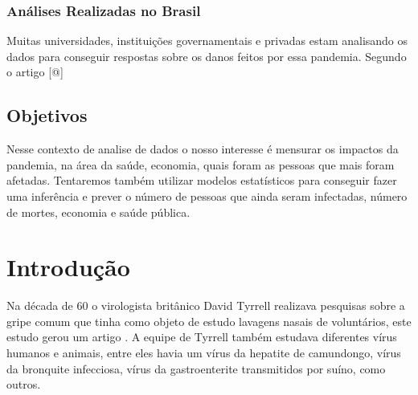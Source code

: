\documentclass[
  fleqn,ebook]{ic}
\begin{document}
\hypertarget{anuxe1lises-realizadas-no-brasil}{%
\subsubsection{Análises Realizadas no Brasil}\label{anuxe1lises-realizadas-no-brasil}}

Muitas universidades, instituições governamentais e privadas estam analisando
os dados para conseguir respostas sobre os danos feitos por essa pandemia.
Segundo o artigo {[}@{]}

\hypertarget{objetivos}{%
\subsection{Objetivos}\label{objetivos}}

Nesse contexto de analise de dados o nosso interesse é mensurar os impactos da
pandemia, na área da saúde, economia, quais foram as pessoas que
mais foram afetadas. Tentaremos também utilizar modelos estatísticos para
conseguir fazer uma inferência e prever o número de pessoas que ainda seram
infectadas, número de mortes, economia e saúde pública.

\nocite{*}

\hypertarget{introduuxe7uxe3o}{%
\section{Introdução}\label{introduuxe7uxe3o}}

Na década de 60 o virologista britânico David Tyrrell realizava pesquisas sobre
a gripe comum que tinha como objeto de estudo lavagens nasais de voluntários,
este estudo gerou um artigo \citep{tyrrell1965cultivation}. A equipe de Tyrrell
também estudava diferentes vírus humanos e animais, entre eles havia um vírus
da hepatite de camundongo, vírus da bronquite infecciosa, vírus da
gastroenterite transmitidos por suíno, como outros.
\end{document}
